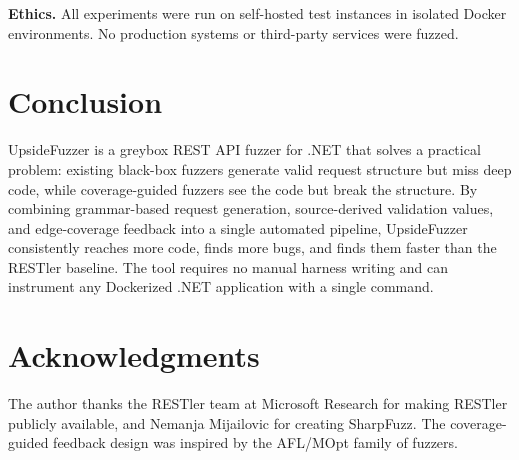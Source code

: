 \documentclass[conference]{IEEEtran}
\begin{document}
\textbf{Ethics.} All experiments were run on self-hosted test instances in isolated Docker environments. No production systems or third-party services were fuzzed.

\section{Conclusion}

UpsideFuzzer is a greybox REST API fuzzer for .NET that solves a practical problem: existing black-box fuzzers generate valid request structure but miss deep code, while coverage-guided fuzzers see the code but break the structure. By combining grammar-based request generation, source-derived validation values, and edge-coverage feedback into a single automated pipeline, UpsideFuzzer consistently reaches more code, finds more bugs, and finds them faster than the RESTler baseline. The tool requires no manual harness writing and can instrument any Dockerized .NET application with a single command.

\section*{Acknowledgments}
The author thanks the RESTler team at Microsoft Research for making RESTler publicly available, and Nemanja Mijailovic for creating SharpFuzz. The coverage-guided feedback design was inspired by the AFL/MOpt family of fuzzers.
\end{document}
